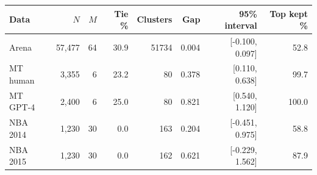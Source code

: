 \begin{tabular}{lrrrrrrr}
\toprule
Data & $N$ & $M$ & Tie \% & Clusters & Gap & 95\% interval & Top kept \% \\
\midrule
Arena & 57,477 & 64 & 30.9 & 51734 & 0.004 & [-0.100, 0.097] & 52.8 \\
MT human & 3,355 & 6 & 23.2 & 80 & 0.378 & [0.110, 0.638] & 99.7 \\
MT GPT-4 & 2,400 & 6 & 25.0 & 80 & 0.821 & [0.540, 1.120] & 100.0 \\
NBA 2014 & 1,230 & 30 & 0.0 & 163 & 0.204 & [-0.451, 0.975] & 58.8 \\
NBA 2015 & 1,230 & 30 & 0.0 & 162 & 0.621 & [-0.229, 1.562] & 87.9 \\
\bottomrule
\end{tabular}
